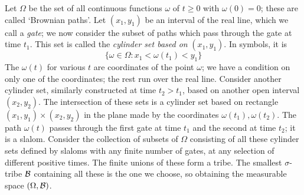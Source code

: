 Let $\Omega$ be the set of all continuous functions $\omega$ of $t\geq 0$
with $\omega(0)=0$;
these are called `Brownian paths'. Let $(x_1,y_1)$ be an interval of the
real line, which we call a {\em gate}; we now
consider the subset of paths which pass through the gate at time $t_1$. This set is called
the {\em cylinder set based on} $(x_1,y_1)$.
In symbols, it is
\[\{\omega\in\Omega:x_1<\omega(t_1)<y_1\}\]
The $\omega(t)$ for various $t$ are
coordinates of the point $\omega$; we have a condition
on only one of the coordinates; the rest run over the real line. Consider
another cylinder set, similarly constructed at time $t_2>t_1$, based on
another open interval $(x_2,y_2)$. The intersection of these sets is a
cylinder set based on rectangle $(x_1,y_1)\times(x_2,y_2)$ in the plane
made by the coordinates $\omega(t_1),\omega(t_2)$. The path $\omega(t)$
passes through the first gate at time $t_1$ and the
second at time $t_2$; it is a slalom. Consider the collection of subsets
of $\Omega$ consisting of all these cylinder sets defined by slaloms with
any finite number of gates, at any selection of different positive times.
The finite unions of these form a tribe. The smallest $\sigma$-tribe
${\cal B}$ containing all these is the one we choose, so obtaining
the measurable space $(\Omega,{\cal B})$.

